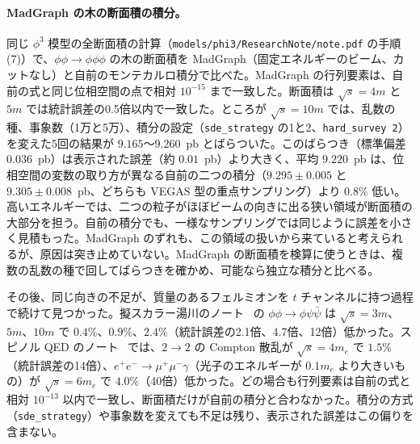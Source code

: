 \documentclass[a4paper,10pt]{ltjsarticle}
\begin{document}
\paragraph{MadGraph の木の断面積の積分。}同じ $\phi^3$ 模型の全断面積の計算（\nolinkurl{models/phi3/ResearchNote/note.pdf} の手順 (7)）で、$\phi\phi\to\phi\phi\phi$ の木の断面積を MadGraph（固定エネルギーのビーム、カットなし）と自前のモンテカルロ積分で比べた。MadGraph の行列要素は、自前の式と同じ位相空間の点で相対 $10^{-15}$ まで一致した。断面積は $\sqrt s=4m$ と $5m$ では統計誤差の0.5倍以内で一致した。ところが $\sqrt s=10m$ では、乱数の種、事象数（1万と5万）、積分の設定（\texttt{sde\_strategy} の1と2、\texttt{hard\_survey 2}）を変えた5回の結果が $9.165$〜$9.260$~pb とばらついた。このばらつき（標準偏差 $0.036$~pb）は表示された誤差（約 $0.01$~pb）より大きく、平均 $9.220$~pb は、位相空間の変数の取り方が異なる自前の二つの積分（$9.295\pm0.005$ と $9.305\pm0.008$~pb、どちらも VEGAS 型の重点サンプリング）より $0.8\%$ 低い。高いエネルギーでは、二つの粒子がほぼビームの向きに出る狭い領域が断面積の大部分を担う。自前の積分でも、一様なサンプリングでは同じように誤差を小さく見積もった。MadGraph のずれも、この領域の扱いから来ていると考えられるが、原因は突き止めていない。MadGraph の断面積を検算に使うときは、複数の乱数の種で回してばらつきを確かめ、可能なら独立な積分と比べる。

その後、同じ向きの不足が、質量のあるフェルミオンを $t$ チャンネルに持つ過程で続けて見つかった。擬スカラー湯川のノート~\cite{yukawanote} の $\phi\phi\to\phi\psi\bar\psi$ は $\sqrt s=3m$、$5m$、$10m$ で $0.4\%$、$0.9\%$、$2.4\%$（統計誤差の2.1倍、4.7倍、12倍）低かった。スピノル QED のノート~\cite{qednote} では、$2\to2$ の Compton 散乱が $\sqrt s=4m_e$ で $1.5\%$（統計誤差の14倍）、$e^+e^-\to\mu^+\mu^-\gamma$（光子のエネルギーが $0.1m_e$ より大きいもの）が $\sqrt s=6m_e$ で $4.0\%$（40倍）低かった。どの場合も行列要素は自前の式と相対 $10^{-13}$ 以内で一致し、断面積だけが自前の積分と合わなかった。積分の方式（\texttt{sde\_strategy}）や事象数を変えても不足は残り、表示された誤差はこの偏りを含まない。
\end{document}
